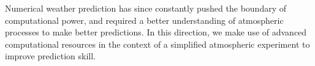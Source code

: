 Numerical weather prediction has since constantly pushed the boundary of computational power, and required a better understanding of atmospheric processes to make better predictions.
In this direction, we make use of advanced computational resources in the context of a simplified atmospheric experiment to improve prediction skill.
